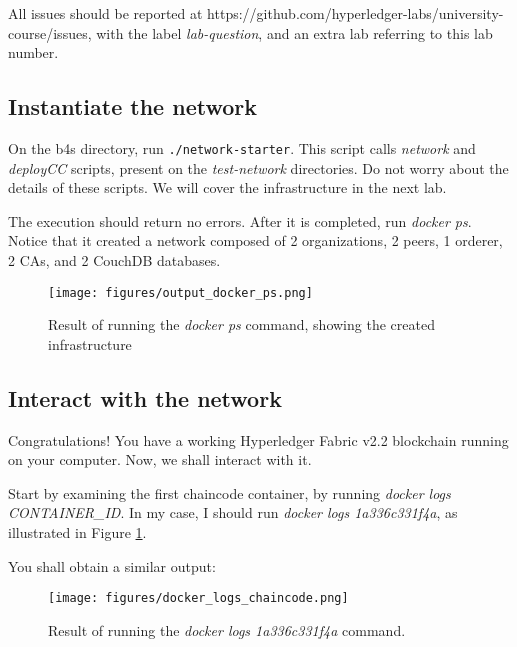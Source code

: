 \documentclass[12pt,a4paper]{article}
\theoremstyle{definition}
\begin{document}
    All issues should be reported at https://github.com/hyperledger-labs/university-course/issues, with the label \emph{lab-question}, and an extra lab referring to this lab number.

    \subsection{Instantiate the network}
    On the b4s directory, run \texttt{./network-starter}. This script calls \emph{network} and \emph{deployCC} scripts, present on the \emph{test-network} directories. Do not worry about the details of these scripts. We will cover the infrastructure in the next lab.

    The execution should return no errors. After it is completed, run \emph{docker ps}. Notice that it created a network composed of 2 organizations, 2 peers, 1 orderer, 2 CAs, and 2 CouchDB databases.

    \begin{figure}[h]
        \centering
        \texttt{[image: figures/output\_docker\_ps.png]}
        \caption{Result of running the \emph{docker ps} command, showing the created infrastructure}
        \label{fig:docker}
    \end{figure}

    \subsection{Interact with the network}
    Congratulations! You have a working Hyperledger Fabric v2.2 blockchain running on your computer. Now, we shall interact with it.

    Start by examining the first chaincode container, by running \emph{docker logs CONTAINER\_ID}. In my case, I should run \emph{docker logs 1a336c331f4a}, as illustrated in Figure \ref{fig:docker}.

    You shall obtain a similar output:

    \begin{figure}[h]
        \centering
        \texttt{[image: figures/docker\_logs\_chaincode.png]}
        \caption{Result of running the \emph{docker logs 1a336c331f4a} command.}
        \label{fig:docker_chaincode}
    \end{figure}

\end{document}
